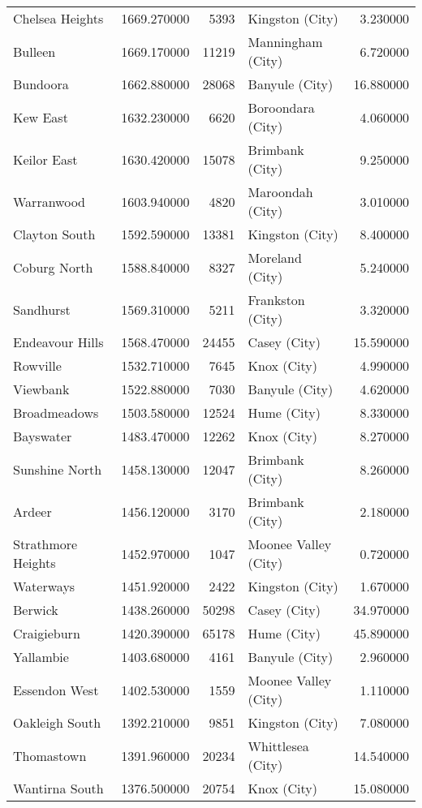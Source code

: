 \begin{longtable}{lrrlr}
Chelsea Heights & 1669.270000 & 5393 & Kingston (City) & 3.230000 \\
Bulleen & 1669.170000 & 11219 & Manningham (City) & 6.720000 \\
Bundoora & 1662.880000 & 28068 & Banyule (City) & 16.880000 \\
Kew East & 1632.230000 & 6620 & Boroondara (City) & 4.060000 \\
Keilor East & 1630.420000 & 15078 & Brimbank (City) & 9.250000 \\
Warranwood & 1603.940000 & 4820 & Maroondah (City) & 3.010000 \\
Clayton South & 1592.590000 & 13381 & Kingston (City) & 8.400000 \\
Coburg North & 1588.840000 & 8327 & Moreland (City) & 5.240000 \\
Sandhurst & 1569.310000 & 5211 & Frankston (City) & 3.320000 \\
Endeavour Hills & 1568.470000 & 24455 & Casey (City) & 15.590000 \\
Rowville & 1532.710000 & 7645 & Knox (City) & 4.990000 \\
Viewbank & 1522.880000 & 7030 & Banyule (City) & 4.620000 \\
Broadmeadows & 1503.580000 & 12524 & Hume (City) & 8.330000 \\
Bayswater & 1483.470000 & 12262 & Knox (City) & 8.270000 \\
Sunshine North & 1458.130000 & 12047 & Brimbank (City) & 8.260000 \\
Ardeer & 1456.120000 & 3170 & Brimbank (City) & 2.180000 \\
Strathmore Heights & 1452.970000 & 1047 & Moonee Valley (City) & 0.720000 \\
Waterways & 1451.920000 & 2422 & Kingston (City) & 1.670000 \\
Berwick & 1438.260000 & 50298 & Casey (City) & 34.970000 \\
Craigieburn & 1420.390000 & 65178 & Hume (City) & 45.890000 \\
Yallambie & 1403.680000 & 4161 & Banyule (City) & 2.960000 \\
Essendon West & 1402.530000 & 1559 & Moonee Valley (City) & 1.110000 \\
Oakleigh South & 1392.210000 & 9851 & Kingston (City) & 7.080000 \\
Thomastown & 1391.960000 & 20234 & Whittlesea (City) & 14.540000 \\
Wantirna South & 1376.500000 & 20754 & Knox (City) & 15.080000 \\

\end{longtable}
